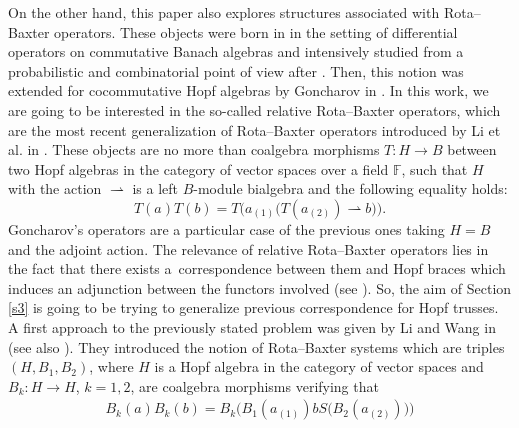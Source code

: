 \documentclass[10pt,a4paper]{amsart}
\numberwithin{equation}{section}
\begin{document}
On the other hand, this paper also explores structures associated with Rota--Baxter operators. These objects were born in \cite{BAXRB} in the setting of differential operators on commutative Banach algebras and intensively studied from a probabilistic and combinatorial point of view after \cite{RORB}. Then, this notion was extended for cocommutative Hopf algebras by Goncharov in \cite{Goncharov}. In this work, we are going to be interested in the so-called relative Rota--Baxter operators, which are the most recent generalization of Rota--Baxter operators introduced by Li et al. in \cite{LST}. These objects are no more than coalgebra morphisms $T\colon H\rightarrow B$ between two Hopf algebras in the category of vector spaces over a field $\mathbb{F}$, such that $H$ with the action $\rightharpoonup$ is a left $B$-module bialgebra and the following equality holds:
\begin{equation}\label{compatrRB-intro}
T(a)T(b)=T\bigl(a_{(1)}\bigl(T(a_{(2)})\rightharpoonup b\bigr)\bigr).
\end{equation}
Goncharov's operators are a particular case of the previous ones taking $H=B$ and the adjoint action. The relevance of relative Rota--Baxter operators lies in the fact that there exists a~correspondence between them and Hopf braces which induces an adjunction between the functors involved (see \cite[Theorem 3.3]{LST}). So, the aim of Section \ref{s3} is going to be trying to generalize previous correspondence for Hopf trusses. A first approach to the previously stated problem was given by Li and Wang in \cite{LW2} (see also \cite{LW}). They introduced the notion of Rota--Baxter systems which are triples $(H,B_{1},B_{2})$, where $H$ is a Hopf algebra in the category of vector spaces and $B_{k}\colon H\rightarrow H$, $k=1,2$, are coalgebra morphisms verifying that
\begin{align*}%
B_{k}(a)B_{k}(b)=B_{k}\bigl(B_{1}(a_{(1)})bS\bigl(B_{2}(a_{(2)})\bigr)\bigr)
\end{align*}
\end{document}
